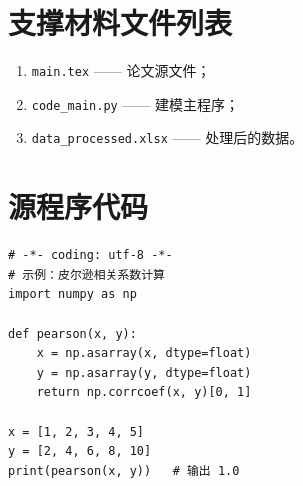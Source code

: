 \documentclass[a4paper, zihao=-4, fontset=windows]{ctexart}
\begin{document}
\section{支撑材料文件列表}

\begin{enumerate}
  \item \texttt{main.tex} —— 论文源文件；
  \item \texttt{code\_main.py} —— 建模主程序；
  \item \texttt{data\_processed.xlsx} —— 处理后的数据。
\end{enumerate}

\section{源程序代码}

\begin{verbatim}
# -*- coding: utf-8 -*-
# 示例：皮尔逊相关系数计算
import numpy as np

def pearson(x, y):
    x = np.asarray(x, dtype=float)
    y = np.asarray(y, dtype=float)
    return np.corrcoef(x, y)[0, 1]

x = [1, 2, 3, 4, 5]
y = [2, 4, 6, 8, 10]
print(pearson(x, y))   # 输出 1.0
\end{verbatim}
\end{document}
